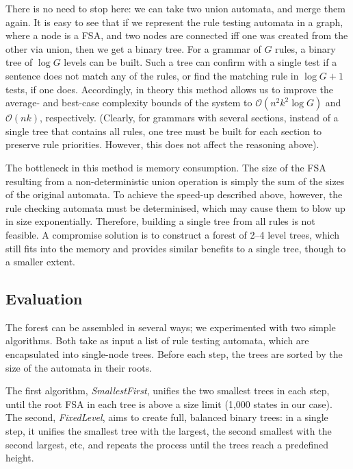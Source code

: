 \documentclass[11pt]{article}
\begin{document}
There is no need to stop here: we can take two union automata, and merge them
again. It is easy to see that if we represent the rule testing automata in a
graph, where a node is a FSA, and two nodes are connected iff one was created
from the other via union, then we get a binary tree. For a grammar of $G$ rules,
a binary tree of $\log G$ levels can be built. Such a tree can confirm with a
single test if a sentence does not match any of the rules, or find the matching
rule in $\log G + 1$ tests, if one does. Accordingly, in theory this method
allows us to improve the average- and best-case complexity bounds of the system
to $\mathcal{O}(n^2k^2\log G)$ and $\mathcal{O}(nk)$, respectively.  %
(Clearly, for grammars with several sections, instead of a single tree that
contains all rules, one tree must be built for each section to preserve rule
priorities. However, this does not affect the reasoning above).  %

The bottleneck in this method is memory consumption. The size of the FSA
resulting from a non-deterministic union operation is simply the sum of the
sizes of the original automata. To achieve the speed-up described above, however,
the rule checking automata must be determinised, which may cause them to blow up in size
exponentially. Therefore, building a single tree from all rules is not feasible.
A compromise solution is to construct a forest of 2--4 level trees, which still
fits into the memory and provides similar benefits to a single tree, though to
a smaller extent.

\subsection{Evaluation}

The forest can be assembled in several ways; we experimented with two simple
algorithms. Both take as input a list of rule testing automata, which are
encapsulated into single-node trees. Before each step, the trees are sorted by
the size of the automata in their roots.

The first algorithm, \textit{SmallestFirst}, unifies the two smallest trees in
each step, until the root FSA in each tree is above a size limit (1,000 states in
our case).
The second, \textit{FixedLevel}, aims to create full, balanced binary trees:
in a single step, it unifies the smallest tree with the largest, the second
smallest with the second largest, etc, and repeats the process until the trees
reach a predefined height.
\end{document}
